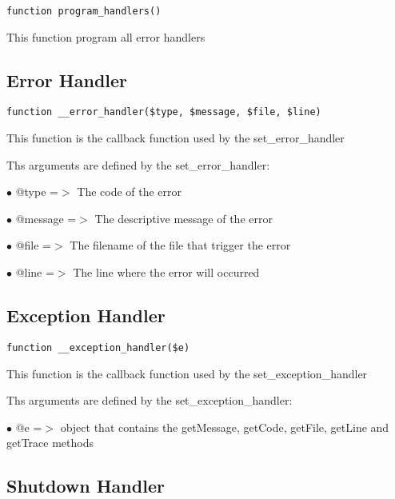 \documentclass[a4paper]{book}
\begin{document}
\begin{lstlisting}
function program_handlers()
\end{lstlisting}

This function program all error handlers

\hypertarget{toc103}{}
\subsection{Error Handler}

\begin{lstlisting}
function __error_handler($type, $message, $file, $line)
\end{lstlisting}

This function is the callback function used by the set\_error\_handler

Ths arguments are defined by the set\_error\_handler:

\begin{compactitem}
\item[\color{myblue}$\bullet$] @type    =$>$ The code of the error
\item[\color{myblue}$\bullet$] @message =$>$ The descriptive message of the error
\item[\color{myblue}$\bullet$] @file    =$>$ The filename of the file that trigger the error
\item[\color{myblue}$\bullet$] @line    =$>$ The line where the error will occurred
\end{compactitem}

\hypertarget{toc104}{}
\subsection{Exception Handler}

\begin{lstlisting}
function __exception_handler($e)
\end{lstlisting}

This function is the callback function used by the set\_exception\_handler

Ths arguments are defined by the set\_exception\_handler:

\begin{compactitem}
\item[\color{myblue}$\bullet$] @e =$>$ object that contains the getMessage, getCode, getFile, getLine and getTrace
      methods
\end{compactitem}

\hypertarget{toc105}{}
\subsection{Shutdown Handler}
\end{document}
